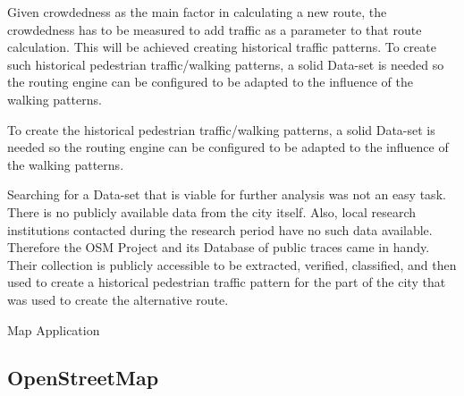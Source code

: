 Given crowdedness as the main factor in calculating a new route, the crowdedness has to be measured to add traffic as a parameter to that route calculation. This will be achieved creating historical traffic patterns. To create such historical pedestrian traffic/walking patterns, a solid Data-set is needed so the routing engine can be configured to be adapted to the influence of the walking patterns. 






To create the historical pedestrian traffic/walking patterns, a solid Data-set is needed so the routing engine can be configured to be adapted to the influence of the walking patterns. 

Searching for a Data-set that is viable for further analysis was not an easy task. There is no publicly available data from the city itself. Also, local research institutions contacted during the research period have no such data available. Therefore the OSM Project and its Database of public traces came in handy. Their collection is publicly accessible to be extracted, verified, classified, and then used to create a historical pedestrian traffic pattern for the part of the city that was used to create the alternative route.

Map Application




\subsection{OpenStreetMap}

